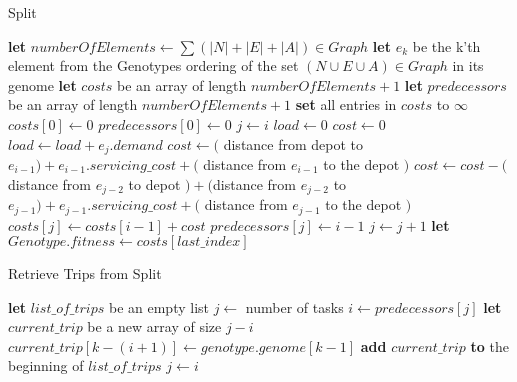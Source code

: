 \begin{algorithm}[thbp]
\caption{Split}\label{split-pseudocode}
\begin{algorithmic}[1]

	\State \textbf{let} $numberOfElements \leftarrow \sum (|N|+|E|+|A|) \in Graph$
	\State \textbf{let} $e_k$ be the k'th element from the Genotypes ordering of the set $(N \cup E \cup A) \in Graph$ in its genome
	\State \textbf{let} $costs$ be an array of length $numberOfElements + 1$
	\State \textbf{let} $predecessors$ be an array of length $numberOfElements + 1$
	\State \textbf{set} all entries in $costs$ to $\infty$
	\State $costs[0] \leftarrow 0$
	\State $predecessors[0] \leftarrow 0$
	\Statex
		\State $j \leftarrow i$
		\State $load \leftarrow 0$
		\State $cost \leftarrow 0$
		\DoWhile
			\State $load \leftarrow load + e_j.demand$
			\Statex
				\State $cost \leftarrow($ distance from depot to $e_{i-1}) + e_{i-1}.servicing\_cost +($ distance from $e_{i-1}$ to the depot $)$
			\Else
				\State $cost \leftarrow  cost - ($ distance from $e_{j-2}$ to depot $) + ($distance from $e_{j-2}$ to $e_{j-1}) + e_{j-1}.servicing\_cost +($ distance from $e_{j-1}$ to the depot $)$
			\EndIf
			\Statex
				\State $costs[j] \leftarrow costs[i - 1] + cost$
				\State $predecessors[j] \leftarrow i - 1$
			\EndIf
			\Statex
			\State $j \leftarrow j + 1$
	\EndFor
	\Statex
	\State \textbf{let} $Genotype.fitness \leftarrow costs[last\_index]$
\EndProcedure

\end{algorithmic}
\end{algorithm}



\begin{algorithm}[thbp]
\caption{Retrieve Trips from Split}\label{split-retrieve-pseudocode}
\begin{algorithmic}[1]

	\State \textbf{let} $list\_of\_trips$ be an empty list
	\State $j \leftarrow$ number of tasks
	\DoWhile
		\State $i \leftarrow predecessors[j]$
		\State \textbf{let} $current\_trip$ be a new array of size $j - i$
			\State $current\_trip[k-(i+1)] \leftarrow genotype.genome[k-1]$
		\EndFor
		\State \textbf{add} $current\_trip$ \textbf{to} the beginning of $list\_of\_trips$
		\State $j \leftarrow i$
\EndProcedure

\end{algorithmic}
\end{algorithm}

